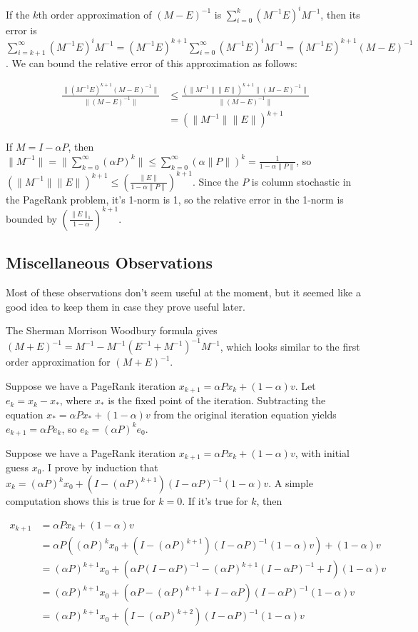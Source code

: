 \documentclass{article}
\newcommand \inv [1] {{#1}^{-1}} %
\begin{document}
If the $k$th order approximation of $(M-E)^{-1}$ is $\sum_{i=0}^k
(\inv M E)^i \inv M$, then its error is $\sum_{i=k+1}^\infty (\inv M
E)^i \inv M = (\inv M E)^{k+1} \sum_{i=0}^\infty (\inv M E)^i \inv M =
(\inv M E)^{k+1}(M-E)^{-1}$. We can bound the relative error of this
approximation as follows:

\begin{align*}
\frac{\|(\inv M E)^{k+1}\inv{(M-E)}\|}{\|\inv{(M-E)}\|} &\leq
\frac{(\|\inv M\|\| E\|)^{k+1}\|(M-E)^{-1}\|}{\|(M-E)^{-1}\|} \\ &=
(\|\inv M\|\|E\|)^{k+1}
\end{align*}

If $M=I-\alpha P$, then $\|\inv M\| = \|\sum_{k=0}^\infty (\alpha
P)^k\| \leq \sum_{k=0}^\infty (\alpha\| P\|)^k = \frac 1
{1-\alpha\|P\|}$, so $(\|\inv M\|\|E\|)^{k+1} \leq
\left(\frac{\|E\|}{1-\alpha\|P\|}\right)^{k+1}$. Since the $P$ is
column stochastic in the PageRank problem, it's 1-norm is 1, so the
relative error in the 1-norm is bounded by
$\left(\frac{\|E\|_1}{1-\alpha}\right)^{k+1}$.

\subsection{Miscellaneous Observations}

Most of these observations don't seem useful at the moment, but it
seemed like a good idea to keep them in case they prove useful later.

The Sherman Morrison Woodbury formula gives $\inv{(M+E)}=\inv M-\inv
M\inv{(\inv E+\inv M)}\inv M$, which looks similar to the first order
approximation for $(M+E)^{-1}$.

Suppose we have a PageRank iteration $x_{k+1}=\alpha Px_k +
(1-\alpha)v$. Let $e_k=x_k-x_*$, where $x_*$ is the fixed point of the
iteration. Subtracting the equation $x_* = \alpha P x_* + (1-\alpha)v$
from the original iteration equation yields $e_{k+1}=\alpha P e_k$, so
$e_k = (\alpha P)^k e_0$.

Suppose we have a PageRank iteration $x_{k+1}=\alpha Px_k +
(1-\alpha)v$, with initial guess $x_0$. I prove by induction that $x_k
= (\alpha P)^k x_0 + (I-(\alpha P)^{k+1})(I-\alpha P)^{-1}
(1-\alpha)v$. A simple computation shows this is true for $k=0$. If
it's true for $k$, then

\begin{align*}
x_{k+1} &= \alpha Px_k + (1-\alpha)v\\ &= \alpha P \left((\alpha P)^k
x_0 + (I-(\alpha P)^{k+1})(I-\alpha P)^{-1} (1-\alpha)v\right) +
(1-\alpha)v\\ &= (\alpha P)^{k+1}x_0+\left(\alpha P(I-\alpha
P)^{-1}-(\alpha P)^{k+1}(I-\alpha P)^{-1} + I\right)(1-\alpha)v\\ &=
(\alpha P)^{k+1}x_0 + (\alpha P - (\alpha P)^{k+1} + I-\alpha
P)(I-\alpha P)^{-1}(1-\alpha)v\\ &= (\alpha P)^{k+1} x_0 + (I-(\alpha
P)^{k+2})(I-\alpha P)^{-1} (1-\alpha)v
\end{align*}
\end{document}
